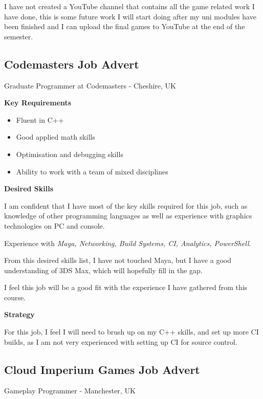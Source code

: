 \documentclass{scrartcl}
\begin{document}
I have not created a YouTube channel that contains all the game related work I have done, this is some future work I will start doing after my uni modules have been finished and I can upload the final games to YouTube at the end of the semester.






\subsection{Codemasters Job Advert}
Graduate Programmer at Codemasters -  Cheshire, UK \cite{JobTwo}

\textbf{Key Requirements}
\begin{itemize}
	\item Fluent in C++
	\item Good applied math skills
	\item Optimisation and debugging skills
	\item Ability to work with a team of mixed disciplines
\end{itemize}

\textbf{Desired Skills}

I am confident that I have most of the key skills required for this job, such as knowledge of other programming languages as well as experience with graphics technologies on PC and console.

Experience with \textit{Maya, Networking, Build Systems, CI, Analytics, PowerShell}.

From this desired skills list, I have not touched Maya, but I have a good understanding of 3DS Max, which will hopefully fill in the gap.

 I feel this job will be a good fit with the experience I have gathered from this course.

\textbf{Strategy}


 For this job, I feel I will need to brush up on my C++ skills, and set up more CI builds, as I am not very experienced with setting up CI for source control.









\subsection{Cloud Imperium Games Job Advert}
Gameplay Programmer -   Manchester, UK \cite{JobThree}
\end{document}
